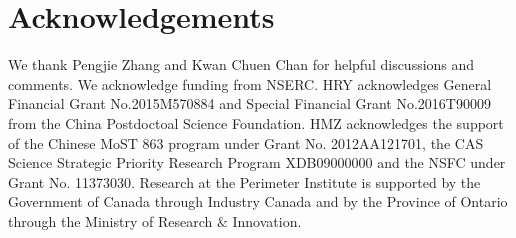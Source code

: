 \documentclass[aps,prd,twocolumn,superscriptaddress,amsfont,amssymb,amsmath,nofootinbib,showpacs,balancelastpage]{revtex4-1}
\begin{document}
\section*{Acknowledgements}
We thank Pengjie Zhang and Kwan Chuen Chan for helpful discussions and comments.
We acknowledge funding from NSERC.
HRY acknowledges General Financial Grant No.2015M570884 and Special Financial Grant No.2016T90009 from the China Postdoctoal Science Foundation.
HMZ acknowledges the support of the Chinese MoST 863 program under Grant
No. 2012AA121701, the CAS Science Strategic Priority Research Program
XDB09000000 and the NSFC under Grant No. 11373030.
Research at the Perimeter Institute is supported by the Government of Canada
through Industry Canada and by the Province of Ontario through the Ministry of
Research $\&$ Innovation.

%


\end{document}
